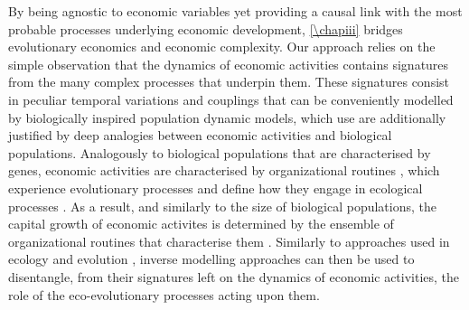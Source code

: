 By being agnostic to economic variables yet providing a causal link with the most probable processes underlying economic development, \cref{\chapiii} bridges evolutionary economics and economic complexity.
% 
Our approach relies on the simple observation that the dynamics of economic activities contains signatures from the many complex processes that underpin them.
% 
These signatures consist in peculiar temporal variations and couplings that can be conveniently modelled by biologically inspired population dynamic models, which use are additionally justified by deep analogies between economic activities and biological populations. 
% 
Analogously to biological populations that are characterised by genes, economic activities are characterised by organizational routines \citep{NelsonWinter}, which experience evolutionary processes and define how they engage in ecological processes \citep{NelsonWinter}.
% 
% 
As a result, and similarly to the size of biological populations, the capital growth of economic activites is determined by the ensemble of organizational routines that characterise them \citep{Boschma2005a}.
% 
Similarly to approaches used in ecology and evolution \citep{Skeels}, inverse modelling approaches can then be used to disentangle, from their signatures \citep{Skeels} left on the dynamics of economic activities, the role of the eco-evolutionary processes acting upon them.

